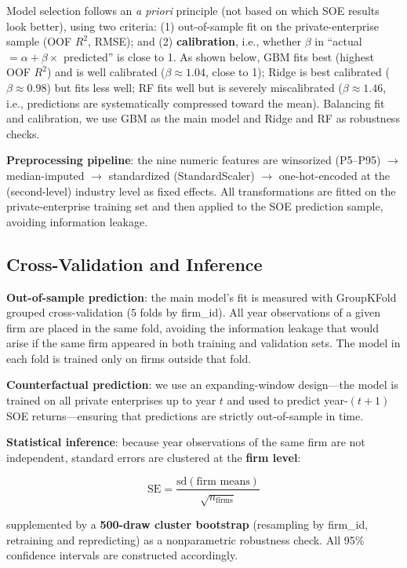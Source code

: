 \documentclass[11pt,a4paper]{article}
\begin{document}
Model selection follows an \emph{a priori} principle (not based on which SOE results look better), using two criteria: (1) out-of-sample fit on the private-enterprise sample (OOF $R^2$, RMSE); and (2) \textbf{calibration}, i.e., whether $\beta$ in ``actual $=\alpha+\beta\times$ predicted'' is close to 1. As shown below, GBM fits best (highest OOF $R^2$) and is well calibrated ($\beta\approx1.04$, close to 1); Ridge is best calibrated ($\beta\approx0.98$) but fits less well; RF fits well but is severely miscalibrated ($\beta\approx1.46$, i.e., predictions are systematically compressed toward the mean). Balancing fit and calibration, we use GBM as the main model and Ridge and RF as robustness checks.

\textbf{Preprocessing pipeline}: the nine numeric features are winsorized (P5--P95) $\to$ median-imputed $\to$ standardized (StandardScaler) $\to$ one-hot-encoded at the (second-level) industry level as fixed effects. All transformations are fitted on the private-enterprise training set and then applied to the SOE prediction sample, avoiding information leakage.

\subsection{Cross-Validation and Inference}

\textbf{Out-of-sample prediction}: the main model's fit is measured with GroupKFold grouped cross-validation (5 folds by firm\_id). All year observations of a given firm are placed in the same fold, avoiding the information leakage that would arise if the same firm appeared in both training and validation sets. The model in each fold is trained only on firms outside that fold.

\textbf{Counterfactual prediction}: we use an expanding-window design---the model is trained on all private enterprises up to year $t$ and used to predict year-$(t+1)$ SOE returns---ensuring that predictions are strictly out-of-sample in time.

\textbf{Statistical inference}: because year observations of the same firm are not independent, standard errors are clustered at the \textbf{firm level}:

\begin{equation}
\text{SE} = \frac{\text{sd}(\text{firm means})}{\sqrt{n_{\text{firms}}}}
\end{equation}

supplemented by a \textbf{500-draw cluster bootstrap} (resampling by firm\_id, retraining and repredicting) as a nonparametric robustness check. All 95\% confidence intervals are constructed accordingly.
\end{document}
